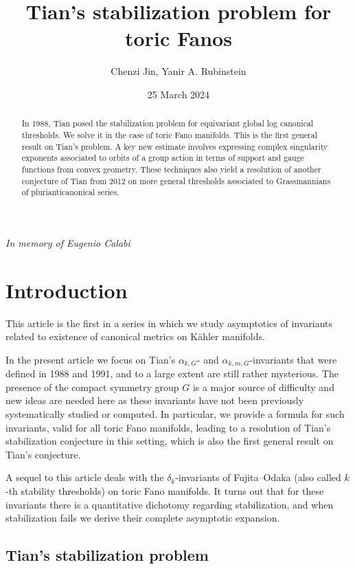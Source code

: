\documentclass{article}
\title{Tian's stabilization problem for toric Fanos}
\author{Chenzi Jin, Yanir A. Rubinstein }
\date{25 March 2024}
\renewcommand{\>}{\rightarrow}
\theoremstyle{plain}
\theoremstyle{definition}
\def\K{K\"ahler }
\def\lb#1{\label{#1}}
\begin{document}
\maketitle

\centerline{\it In memory of Eugenio Calabi}

\bigskip

\begin{abstract}
In 1988, Tian posed the stabilization problem for equivariant global log canonical
thresholds. We solve it in the case of toric Fano manifolds. This is 
the first general result on Tian's problem.
A key new estimate involves expressing complex singularity exponents
associated to orbits of a group action in terms of support and gauge functions from
convex geometry.
These techniques also yield a resolution of another conjecture of Tian from 2012
on more general thresholds associated to Grassmannians of plurianticanonical
series. 
\end{abstract}

\tableofcontents


\section{Introduction}

This article is the first in a series in which we study asymptotics of 
invariants related to 
existence of canonical metrics on \K manifolds. 

In the present article we focus on Tian's
$\alpha_{k,G}$- and $\alpha_{k,m,G}$-invariants
that were defined %
in 1988 and 1991, and to a large extent are still rather mysterious.
The presence of the compact symmetry group $G$ is a major source of difficulty and new ideas are needed
here as these invariants have not been previously systematically
studied or computed. 
In particular, we provide a formula for such invariants, valid for all toric Fano manifolds, leading to a resolution of Tian's
stabilization conjecture in this setting, which is also
the first general result on Tian's conjecture.

A sequel to this article deals with the 
$\delta_k$-invariants of Fujita--Odaka
(also
called $k$-th stability thresholds)
on toric Fano manifolds.
It turns out that for these invariants
there is a quantitative dichotomy regarding stabilization, and when stabilization
fails we derive their complete asymptotic expansion.

\subsection{Tian's stabilization problem}
\lb{TianStabilizationSubSec}
\end{document}
